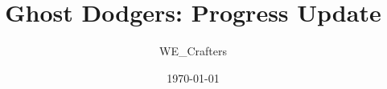\documentclass{beamer}
\title{Ghost Dodgers: Progress Update}
\author{WE\_Crafters}
\date{\today}
\begin{document}
\begin{frame}
  \titlepage
\end{frame}
\end{document}
